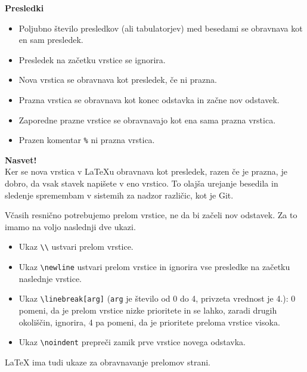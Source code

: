 \textbf{Presledki}

\begin{itemize}
\item Poljubno število presledkov (ali tabulatorjev) med besedami se obravnava kot en sam presledek.
\item Presledek na začetku vrstice se ignorira.
\item Nova vrstica se obravnava kot presledek, če ni prazna.
\item Prazna vrstica se obravnava kot konec odstavka in začne nov odstavek.
\item Zaporedne prazne vrstice se obravnavajo kot ena sama prazna vrstica.
\item Prazen komentar \texttt{\%} ni prazna vrstica.
\end{itemize}

\begin{example}\label{latexuvod_primerspresledki}\end{example}\begin{framed}
\textbf{Nasvet!}\\
Ker se nova vrstica v LaTeXu obravnava kot presledek, razen če je prazna, je dobro, da vsak stavek napišete v eno vrstico.
To olajša urejanje besedila in sledenje spremembam v sistemih za nadzor različic, kot je Git.
\end{framed}

Včasih resnično potrebujemo prelom vrstice, ne da bi začeli nov odstavek. Za to imamo na voljo naslednji dve ukazi.

\begin{itemize}
\item Ukaz \texttt{{\textbackslash}{\textbackslash}} ustvari prelom vrstice.
\item Ukaz \texttt{{\textbackslash}newline} ustvari prelom vrstice in ignorira vse presledke na začetku naslednje vrstice.
\item Ukaz \texttt{{\textbackslash}linebreak[arg]} (\texttt{arg} je število od 0 do 4, privzeta vrednost je 4.): 0 pomeni, da je prelom vrstice nizke prioritete in se lahko, zaradi drugih okoliščin, ignorira, 4 pa pomeni, da je prioritete preloma vrstice visoka.
\item Ukaz \texttt{{\textbackslash}noindent} prepreči zamik prve vrstice novega odstavka.
\end{itemize}

\begin{example}\label{latexuvod_eg-newline}\end{example}LaTeX ima tudi ukaze za obravnavanje prelomov strani.

